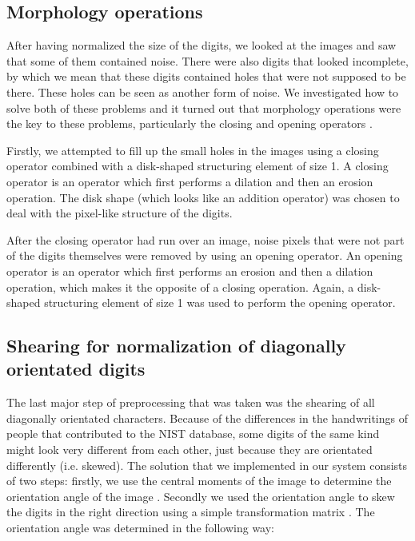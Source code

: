 \documentclass[11pt,twoside,a4paper]{article}
\begin{document}
\subsection{Morphology operations} %
After having normalized the size of the digits, we looked at the images and saw that some of them contained noise. There were also digits that looked incomplete, by which we mean that these digits contained holes that were not supposed to be there. These holes can be seen as another form of noise. We investigated how to solve both of these problems and it turned out that morphology operations were the key to these problems, particularly the closing and opening operators \cite{bishnoi2014} \cite{jamil2008noise}.

Firstly, we attempted to fill up the small holes in the images using a closing operator combined with a disk-shaped structuring element of size 1. A closing operator is an operator which first performs a dilation and then an erosion operation. The disk shape (which looks like an addition operator) was chosen to deal with the pixel-like structure of the digits.

After the closing operator had run over an image, noise pixels that were not part of the digits themselves were removed by using an opening operator. An opening operator is an operator which first performs an erosion and then a dilation operation, which makes it the opposite of a closing operation. Again, a disk-shaped structuring element of size 1 was used to perform the opening operator.

\subsection{Shearing for normalization of diagonally orientated digits}
The last major step of preprocessing that was taken was the shearing of all diagonally orientated characters. Because of the differences in the handwritings of people that contributed to the NIST database, some digits of the same kind might look very different from each other, just because they are orientated differently (i.e. skewed). The solution that we implemented in our system consists of two steps: firstly, we use the central moments of the image to determine the orientation angle of the image \cite{gonzalez2002digital}. Secondly we used the orientation angle to skew the digits in the right direction using a simple transformation matrix \cite{yamaguchi2003digit}. The orientation angle was determined in the following way:
\end{document}
